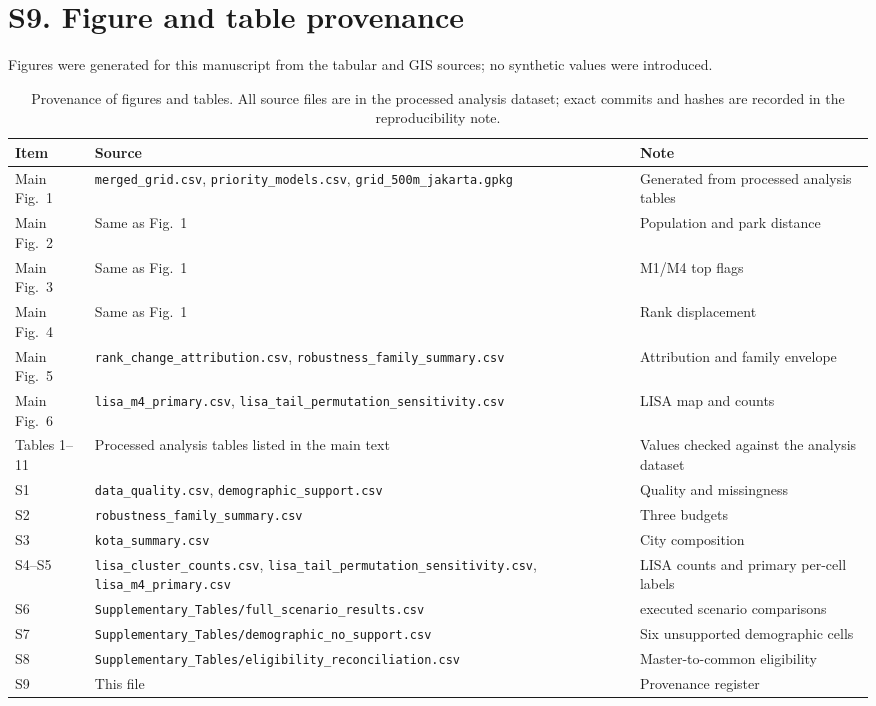 \documentclass[times,twoside]{_Templates/MultiTargetManuscript}
\begin{document}
\section*{S9. Figure and table provenance}

\begin{table}[H]
\centering
\small
\caption{Provenance of figures and tables. All source files are in the processed
analysis dataset; exact commits and hashes are recorded in the reproducibility note.}
Figures were generated for this manuscript from the tabular and GIS sources; no
synthetic values were introduced.
\label{tab:s10}
\begin{tabularx}{\textwidth}{@{}>{\raggedright\arraybackslash}p{3.3cm} >{\raggedright\arraybackslash}X >{\raggedright\arraybackslash}p{4.0cm}@{}}
\toprule
Item & Source & Note \\
\midrule
Main Fig.~1 & \texttt{merged\_grid.csv}, \texttt{priority\_models.csv}, \texttt{grid\_500m\_jakarta.gpkg} & Generated from processed analysis tables \\
Main Fig.~2 & Same as Fig.~1 & Population and park distance \\
Main Fig.~3 & Same as Fig.~1 & M1/M4 top flags \\
Main Fig.~4 & Same as Fig.~1 & Rank displacement \\
Main Fig.~5 & \texttt{rank\_change\_attribution.csv}, \texttt{robustness\_family\_summary.csv} & Attribution and family envelope \\
Main Fig.~6 & \texttt{lisa\_m4\_primary.csv}, \texttt{lisa\_tail\_permutation\_sensitivity.csv} & LISA map and counts \\
Tables 1--11 & Processed analysis tables listed in the main text & Values checked against the analysis dataset \\
S1 & \texttt{data\_quality.csv}, \texttt{demographic\_support.csv} & Quality and missingness \\
S2 & \texttt{robustness\_family\_summary.csv} & Three budgets \\
S3 & \texttt{kota\_summary.csv} & City composition \\
S4--S5 & \texttt{lisa\_cluster\_counts.csv}, \texttt{lisa\_tail\_permutation\_sensitivity.csv}, \texttt{lisa\_m4\_primary.csv} & LISA counts and primary per-cell labels \\
S6 & \texttt{Supplementary\_Tables/full\_scenario\_results.csv} & 49 executed scenario comparisons \\
S7 & \texttt{Supplementary\_Tables/demographic\_no\_support.csv} & Six unsupported demographic cells \\
S8 & \texttt{Supplementary\_Tables/eligibility\_reconciliation.csv} & Master-to-common eligibility \\
S9 & This file & Provenance register \\
\bottomrule
\end{tabularx}
\end{table}
\end{document}

